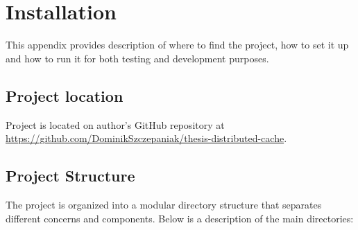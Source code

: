 \documentclass[shortabstract]{iithesis}
\begin{document}
\appendix
\chapter{Installation}
This appendix provides description of where to find the project, how to set it up and how to run it for both testing and development purposes.

\section{Project location}
Project is located on author's GitHub repository at \url{https://github.com/DominikSzczepaniak/thesis-distributed-cache}. 

\section{Project Structure}
The project is organized into a modular directory structure that separates different concerns and components. Below is a description of the main directories:
\end{document}
